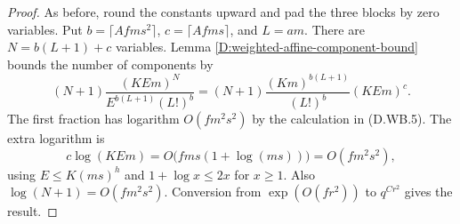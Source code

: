 \begin{proof}
As before, round the constants upward and pad the three
blocks by zero variables. Put
$b=\lceil Afms^2\rceil$, $c=\lceil Afms\rceil$, and $L=am$.
There are $N=b(L+1)+c$ variables. Lemma
\ref{D:weighted-affine-component-bound} bounds the number
of components by
\[
 (N+1)\frac{(KEm)^N}{E^{b(L+1)}(L!)^b}
   =(N+1)\frac{(Km)^{b(L+1)}}{(L!)^b}(KEm)^c.
                                                        \tag{D.WB.6}
\]
The first fraction has logarithm $O(fm^2s^2)$ by the
calculation in (D.WB.5). The extra logarithm is
\[
 c\log(KEm)
       =O\bigl(fms(1+\log(ms))\bigr)
       =O(fm^2s^2),                                    \tag{D.WB.7}
\]
using $E\leq K(ms)^h$ and $1+\log x\leq 2x$ for $x\geq1$.
Also $\log(N+1)=O(fm^2s^2)$. Conversion from
$\exp(O(fr^2))$ to $q^{Cr^2}$ gives the result.
\end{proof}
